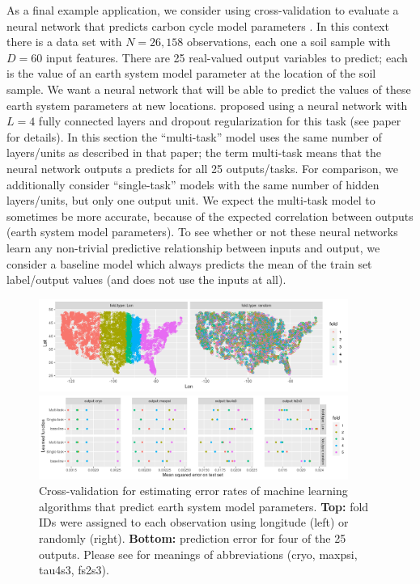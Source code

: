 \documentclass[12pt]{article}
\begin{document}
As a final example application, we consider using cross-validation to
evaluate a neural network that predicts carbon cycle model parameters
\citep{Feng2020}. In this context there is a data set with $N=26,158$
observations, each one a soil sample with $D=60$ input features.
There are 25 real-valued output variables to predict; each is the
value of an earth system model parameter at the location of the soil
sample. We want a neural network that will be able to predict the
values of these earth system parameters at new
locations. \citet{Feng2020} proposed using a neural network with $L=4$
fully connected layers and dropout regularization for this task (see
paper for details). In this section the ``multi-task'' model uses the
same number of layers/units as described in that paper; the term
multi-task means that the neural network outputs a predicts for all 25
outputs/tasks. For comparison, we additionally consider
``single-task'' models with the same number of hidden layers/units,
but only one output unit. We expect the multi-task model to sometimes
be more accurate, because of the expected correlation between outputs
(earth system model parameters). To see whether or not these neural
networks learn any non-trivial predictive relationship between inputs
and output, we consider a baseline model which always predicts the
mean of the train set label/output values (and does not use the inputs
at all).

\begin{figure}
  \centering
  \includegraphics[width=0.9\textwidth]{figure-proda-cv-data-map}

  \includegraphics[width=0.9\textwidth]{figure-proda-cv-some-out}
    \vskip -0.5cm
  \caption{Cross-validation for estimating error rates of machine
    learning algorithms that predict earth system model
    parameters. \textbf{Top:} fold IDs were assigned to each
    observation using longitude (left) or randomly
    (right). \textbf{Bottom:} prediction error for four of the 25
    outputs. Please see \citep{Feng2020} for meanings of abbreviations
    (cryo, maxpsi, tau4s3, fs2s3). }
  \label{fig:proda-cv}
\end{figure}
\end{document}
